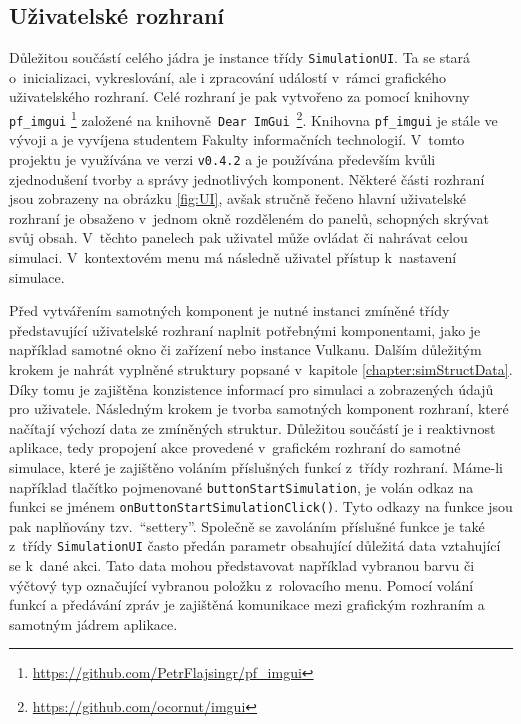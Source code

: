 \subsection{Uživatelské rozhraní}
\label{chapter:uzivRozh}

Důležitou součástí celého jádra je instance třídy \texttt{SimulationUI}. Ta se stará o~inicializaci, vykreslování, ale i zpracování událostí v~rámci grafického uživatelského rozhraní. Celé rozhraní je pak vytvořeno za pomocí knihovny \texttt{pf\_imgui} \footnote{\url{https://github.com/PetrFlajsingr/pf_imgui}} založené na knihovně~\texttt{Dear ImGui}~\footnote{\url{https://github.com/ocornut/imgui}}. Knihovna \texttt{pf\_imgui} je stále ve vývoji a je vyvíjena studentem Fakulty informačních technologií. V~tomto projektu je využívána ve verzi  \texttt{v0.4.2} a je používána především kvůli zjednodušení tvorby a správy jednotlivých komponent. Některé části rozhraní jsou zobrazeny na obrázku \ref{fig:UI}, avšak stručně řečeno hlavní uživatelské rozhraní je obsaženo v~jednom okně rozděleném do panelů, schopných skrývat svůj obsah. V~těchto panelech pak uživatel může ovládat či nahrávat celou simulaci. V~kontextovém menu má následně uživatel přístup k~nastavení simulace.

Před vytvářením samotných komponent je nutné instanci zmíněné třídy představující uživatelské rozhraní naplnit potřebnými komponentami, jako je například samotné okno či zařízení nebo instance Vulkanu. Dalším důležitým krokem je nahrát vyplněné struktury popsané v~kapitole \ref{chapter:simStructData}. Díky tomu je zajištěna konzistence informací pro simulaci a zobrazených údajů pro uživatele. Následným krokem je tvorba samotných komponent rozhraní, které načítají výchozí data ze zmíněných struktur. Důležitou součástí je i reaktivnost aplikace, tedy propojení akce provedené v~grafickém rozhraní do samotné simulace, které je zajištěno voláním příslušných funkcí z~třídy rozhraní. Máme-li například tlačítko pojmenované \texttt{buttonStartSimulation}, je volán odkaz na funkci se jménem \texttt{onButtonStartSimulationClick()}. Tyto odkazy na funkce jsou pak naplňovány tzv.~\enquote{settery}. Společně se zavoláním příslušné funkce je také z~třídy \texttt{SimulationUI} často předán parametr obsahující důležitá data vztahující se k~dané akci. Tato data mohou představovat například vybranou barvu či výčtový typ označující vybranou položku z~rolovacího menu. Pomocí volání funkcí a předávání zpráv je zajištěná komunikace mezi grafickým rozhraním a samotným jádrem aplikace.

